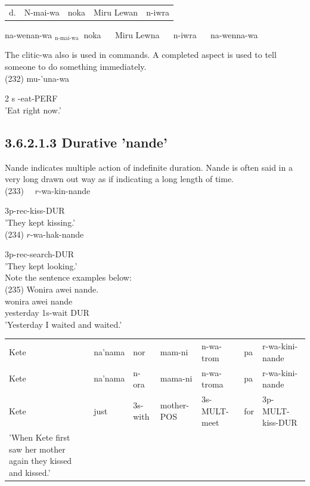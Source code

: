 \documentclass[10pt]{article}
\begin{document}
\begin{center}
\begin{tabular}{lrlll}
d. & N-mai-wa & noka & Miru Lewan & n-iwra \\
\end{tabular}
\end{center} na-wenan-wa \({ }_{\text {n-mai-wa }}\) noka \(\quad\) Miru Lewna \(\quad\) n-iwra \(\quad\) na-wenna-wa

The clitic-wa also is used in commands. A completed aspect is used to tell someone to do something immediately.\\
(232) mu-'una-wa

2 s -eat-PERF\\
'Eat right now.'

\subsection*{3.6.2.1.3 Durative 'nande'}
Nande indicates multiple action of indefinite duration. Nande is often said in a very long drawn out way as if indicating a long length of time.\\
(233) \(\quad r\)-wa-kin-nande

3p-rec-kiss-DUR\\
'They kept kissing.'\\
(234) \(r\)-wa-hak-nande

3p-rec-search-DUR\\
'They kept looking.'\\
Note the sentence examples below:\\
(235) Wonira awei nande.\\
wonira awei nande\\
yesterday 1s-wait DUR\\
'Yesterday I waited and waited.'

\begin{center}
\begin{tabular}{lllllll}
Kete & na'nama & nor & mam-ni & n-wa-trom & pa & r-wa-kini-nande \\
Kete & na'nama & n-ora & mama-ni & n-wa-troma & pa & r-wa-kini-nande \\
Kete & just & 3s-with & mother-POS & 3s-MULT-meet & for & 3p-MULT-kiss-DUR \\
'When Kete first saw her mother again they kissed and kissed.' &  &  &  &  &  &  \\
\end{tabular}
\end{center}
\end{document}
